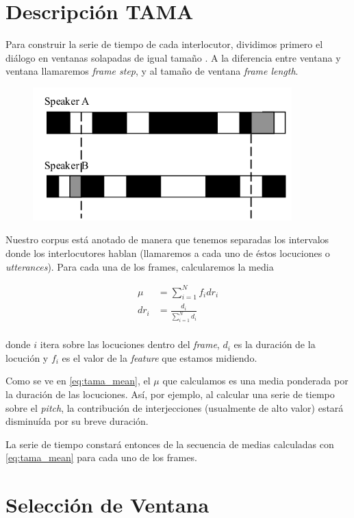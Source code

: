 \section{Descripción TAMA}

Para construir la serie de tiempo de cada interlocutor, dividimos primero el diálogo en ventanas solapadas de igual tamaño \cite{KOU2008}. A la diferencia entre ventana y ventana llamaremos \emph{frame step}, y al tamaño de ventana \emph{frame length}.

\begin{figure}
\centering
\includegraphics[width=10cm]{images/tama.png}

\end{figure}

Nuestro corpus está anotado de manera que tenemos separadas los intervalos donde los interlocutores hablan (llamaremos a cada uno de éstos locuciones o \emph{utterances}). Para cada una de los frames, calcularemos la media

\begin{align}
    \mu &= \sum\limits_{i=1}^N f_i dr_i \label{eq:tama_mean}\\
    dr_i &= \frac{d_i}{\sum\limits_{i=1}^N d_i} \\
\end{align}

donde $i$ itera sobre las locuciones dentro del \emph{frame}, $d_i$ es la duración de la locución y $f_i$ es el valor de la \emph{feature} que estamos midiendo.

Como se ve en \ref{eq:tama_mean}, el $\mu$ que calculamos es una media ponderada por la duración de las locuciones. Así, por ejemplo, al calcular una serie de tiempo sobre el \emph{pitch}, la contribución de interjecciones (usualmente de alto valor) estará disminuída por su breve duración.

La serie de tiempo constará entonces de la secuencia de medias calculadas con \ref{eq:tama_mean} para cada uno de los frames.


\section{Selección de Ventana}

